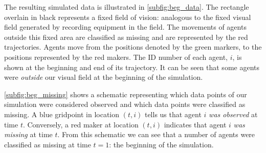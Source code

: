 The resulting simulated data is illustrated in \cref{subfig:beg_data}. The
rectangle overlain in black represents a fixed field of vision: analogous to
the fixed visual field generated by recording equipment in the field. The
movements of agents outside this fixed area are classified as missing and are
represented by the red trajectories. Agents move from the positions denoted by
the green markers, to the positions represented by the red makers. The ID
number of each agent, $i$, is shown at the beginning and end of its trajectory.
It can be seen that some agents were \emph{outside} our visual field at the
beginning of the simulation. 

\cref{subfig:beg_missing} shows a schematic representing which data points of
our simulation were considered observed and which data points were classified
as missing. A blue gridpoint in location $(t, i)$ tells us that agent $i$
\emph{was observed} at time $t$. Conversely, a red maker at location $(t, i)$
indicates that agent $i$ \emph{was missing} at time $t$. From this schematic we
can see that a number of agents were classified as missing at time $t=1$: the
beginning of the simulation.

